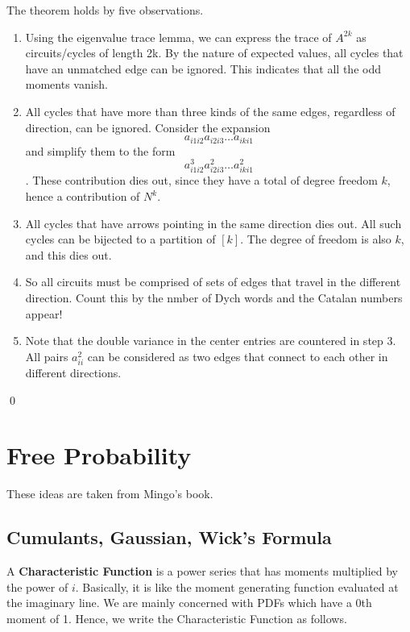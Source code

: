 \documentclass{article}
\begin{document}
The theorem holds by five observations. 
\begin{enumerate}
    \item Using the eigenvalue trace lemma, we can express 
    the trace of $A^{2k}$ as circuits/cycles of length 2k. 
    By the nature of expected values, all cycles that have 
    an unmatched edge can be ignored. This indicates that 
    all the odd moments vanish. 
    \item All cycles that have more than three kinds of the 
    same edges, regardless of direction, can be ignored. 
    Consider the expansion
    \[
        a_{i1i2}a_{i2i3} \dots a_{iki1}
    \]
    and simplify them to the form 
    \[
        a_{i1i2}^3a_{i2i3}^2 \dots a_{iki1}^2
    \]
    . These contribution dies out, since they have a total 
    of degree freedom $k$, hence a contribution of $N^{k}$. 
    \item All cycles that have arrows pointing in the same direction 
    dies out. All such cycles can be bijected to a partition of 
    $[k]$. The degree of freedom is also $k$, and this dies out. 
    \item So all circuits must be comprised of sets of edges 
    that travel in the different direction. Count this by the 
    nmber of Dych words and the Catalan numbers appear!
    \item Note that the double variance in the center entries 
    are countered in step 3. All pairs $a_{ii}^2$ can be 
    considered as two edges that connect to each other in different directions. 
\end{enumerate}
\hfill \qed

\newpage
\section{Free Probability}

These ideas are taken from Mingo's book. 

\subsection{Cumulants, Gaussian, Wick's Formula}

A \textbf{Characteristic Function} 
is a power series that has moments multiplied 
by the power of $i$. Basically, it is like the 
moment generating function evaluated at the imaginary line. 
We are mainly concerned with PDFs which have a 0th moment of 1. 
Hence, we write the Characteristic Function as follows. 
\end{document}
